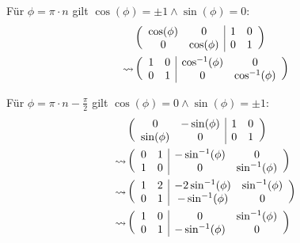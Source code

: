 \documentclass[main.tex]{subfiles}
\begin{document}
Für $\phi = \pi \cdot n$ gilt $\cos (\phi) = \pm 1 \wedge \sin (\phi) = 0$:
\begin{align*}
    & \eqmatrix{cc|cc}{
        \cos (\phi) & 0 &  1 & 0 \\
        0 &  \cos (\phi) &  0 & 1 \\
    }\\
    \leadsto & \eqmatrix{cc|cc}{
        1 & 0 & \cos^{-1}(\phi) & 0 \\
        0 & 1 &               0 & \cos^{-1}(\phi) \\
    }
\end{align*}

Für $\phi = \pi \cdot n - \frac{\pi}{2}$ gilt $\cos (\phi) = 0 \wedge \sin (\phi) = \pm 1$:
\begin{align*}
    & \eqmatrix{cc|cc}{
        0           & -\sin (\phi) & 1 & 0 \\
        \sin (\phi) & 0            & 0 & 1 \\
    }\\
    \leadsto & \eqmatrix{cc|cc}{
        0 & 1 & -\sin^{-1} (\phi) & 0 \\
        1 & 0 & 0 & \sin^{-1}(\phi) \\
    }\\
    \leadsto & \eqmatrix{cc|cc}{
        1 & 2 & -2\sin^{-1} (\phi) & \sin^{-1}(\phi) \\
        0 & 1 & -\sin^{-1} (\phi) & 0 \\
    }\\
    \leadsto & \eqmatrix{cc|cc}{
        1 & 0 & 0                 & \sin^{-1}(\phi) \\
        0 & 1 & -\sin^{-1} (\phi) & 0 \\
    }\\
\end{align*}
\end{document}
